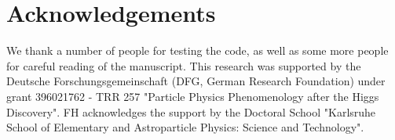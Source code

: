 \documentclass[11pt,a4paper]{article}
\begin{document}
\section*{Acknowledgements}
We thank a number of people for testing the code, as well as some more people for careful reading of the manuscript.
This research was supported by the Deutsche Forschungsgemeinschaft (DFG, German Research Foundation) under grant 396021762 - TRR 257 "Particle Physics Phenomenology after the Higgs Discovery".
FH acknowledges the support by the Doctoral School "Karlsruhe School of Elementary and Astroparticle Physics: Science and Technology".

{}

\end{document}
